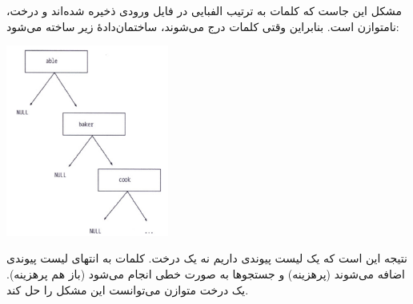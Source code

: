 \section{}
\paragraph{}\label{answer:74}
مشکل این جاست که کلمات به ترتیب الفبایی در فایل ورودی ذخیره شده‌اند و درخت، نامتوازن است. بنابراین وقتی کلمات درج می‌شوند، ساختمان‌دادهٔ زیر ساخته می‌شود:
\begin{center}
    \includegraphics[keepaspectratio,width=0.4\textwidth,height=0.4\textheight]{images/image08.jpg}
\end{center}
نتیجه این است که یک لیست پیوندی داریم نه یک درخت. کلمات به انتهای لیست پیوندی اضافه می‌شوند (پرهزینه) و جستجوها به صورت خطی انجام می‌شود (باز هم پرهزینه). یک درخت متوازن می‌توانست این مشکل را حل کند.